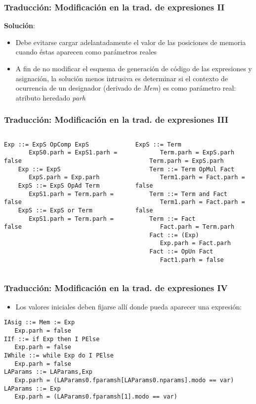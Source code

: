 \documentclass[hyperref={pdfpagelabels=false},tree-dvips,compress]{beamer}
\begin{document}
\begin{frame}[fragile]
\frametitle{Traducción: Modificación en la trad. de expresiones II}

\textbf{Solución}:
\begin{itemize}
	\item Debe evitarse cargar adelantadamente el valor de las posiciones de memoria cuando éstas aparecen como parámetros reales
	\item A fin de no modificar el esquema de generación de código de las expresiones y asignación, la solución menos intrusiva es determinar si el contexto de ocurrencia de un designador (derivado de \emph{Mem}) es como parámetro real: atributo heredado \emph{parh}
\end{itemize}

\end{frame}
\begin{frame}[fragile]
\frametitle{Traducción: Modificación en la trad. de expresiones III}

\begin{columns}[T]
	\begin{lstlisting}[style=gramaticas,basicstyle=\footnotesize\ttfamily]
	Exp ::= ExpS OpComp ExpS
	   ExpS0.parh = ExpS1.parh = false
	Exp ::= ExpS
	   ExpS.parh = Exp.parh
	ExpS ::= ExpS OpAd Term
	   ExpS1.parh = Term.parh = false
	ExpS ::= ExpS or Term
	   ExpS1.parh = Term.parh = false
	\end{lstlisting}
	\begin{lstlisting}[style=gramaticas,basicstyle=\footnotesize\ttfamily]
	ExpS ::= Term
	   Term.parh = ExpS.parh
	Term.parh = ExpS.parh
	Term ::= Term OpMul Fact
	   Term1.parh = Fact.parh = false
	Term ::= Term and Fact
	   Term1.parh = Fact.parh = false
	Term ::= Fact
	   Fact.parh = Term.parh
	Fact ::= (Exp)
	   Exp.parh	= Fact.parh
	Fact ::= OpUn Fact
	   Fact1.parh = false
	\end{lstlisting}
\end{columns}

\end{frame}
\begin{frame}[fragile]
\frametitle{Traducción: Modificación en la trad. de expresiones IV}

\begin{itemize}
	\item Los valores iniciales deben fijarse allí donde pueda aparecer una expresión:
\end{itemize}

\begin{lstlisting}[style=gramaticas,basicstyle=\footnotesize\ttfamily]
IAsig ::= Mem := Exp
   Exp.parh = false
IIf ::= if Exp then I PElse
   Exp.parh = false
IWhile ::= while Exp do I PElse
   Exp.parh = false
LAParams ::= LAParams,Exp
   Exp.parh = (LAParams0.fparamsh[LAParams0.nparams].modo == var)
LAParams ::= Exp
   Exp.parh = (LAParams0.fparamsh[1].modo == var)
\end{lstlisting}

\end{frame}
\end{document}
